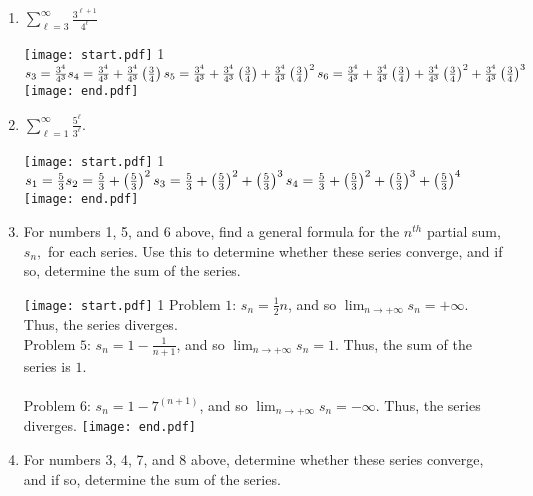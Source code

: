 \documentclass[12pt]{article}
\begin{document}
\begin{enumerate}
\item $\sum_{\ell=3}^{\infty}\frac{3^{\ell+1}}{4^{\ell}}$

\texttt{[image: start.pdf]}
{{{1\linewidth}{$s_3=\frac{3^4}{4^3}
\\s_4=\frac{3^4}{4^3}+\frac{3^4}{4^3}\left(\frac{3}{4}\right)
\\s_5=\frac{3^4}{4^3}+\frac{3^4}{4^3}\left(\frac{3}{4}\right)+\frac{3^4}{4^3}\left(\frac{3}{4}\right)^2
\\s_6=\frac{3^4}{4^3}+\frac{3^4}{4^3}\left(\frac{3}{4}\right)+\frac{3^4}{4^3}\left(\frac{3}{4}\right)^2+\frac{3^4}{4^3}\left(\frac{3}{4}\right)^3$   }}}
\texttt{[image: end.pdf]}


\item $\sum_{\ell=1}^{\infty}\frac{5^{\ell}}{3^{\ell}}.$

\texttt{[image: start.pdf]}
{{{1\linewidth}{$s_1=\frac{5}{3}
\\s_2=\frac{5}{3}+\left(\frac{5}{3}\right)^2
\\s_3=\frac{5}{3}+\left(\frac{5}{3}\right)^2+\left(\frac{5}{3}\right)^3
\\s_4=\frac{5}{3}+\left(\frac{5}{3}\right)^2+\left(\frac{5}{3}\right)^3+\left(\frac{5}{3}\right)^4$   }}}
\texttt{[image: end.pdf]}


\item For numbers 1, 5, and 6 above, find a general formula for the $n^{\mathit{th}}$ partial sum, $s_{n},$ for each series.  Use this to determine
whether these series converge, and if so, determine the sum of the series. 

\texttt{[image: start.pdf]}
{{{1\linewidth}{
Problem $1$: $s_n=\frac{1}{2}n$, and so $\lim_{n \rightarrow +\infty}s_n = +\infty$.  Thus, the series diverges.
\\Problem $5$: $s_n=1 - \frac{1}{n+1}$, and so $\lim_{n \rightarrow +\infty}s_n = 1$.  Thus, the sum of the series is $1$.
\\ \\ Problem $6$: $s_n=1 - 7^{(n+1)}$, and so $\lim_{n \rightarrow +\infty}s_n = -\infty$.  Thus, the series diverges.
 }}}
\texttt{[image: end.pdf]}


\item For numbers 3, 4, 7, and 8 above, determine whether these series converge, and if so, determine the sum of the series.


\end{enumerate}
\end{document}
